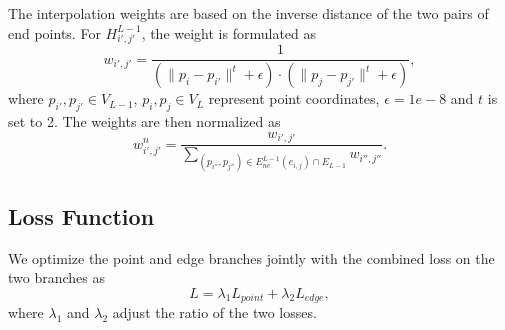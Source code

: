 \documentclass[10pt,twocolumn,letterpaper]{article}
\begin{document}
The interpolation weights are based on the inverse distance of the two pairs of end points. For $H_{i', j'}^{L-1}$, the weight is formulated as
\begin{equation}
w_{i', j'} = \frac{1}{(\| p_i - p_{i'} \|^t + \epsilon)\cdot(\| p_j - p_{j'} \|^t + \epsilon)},
\end{equation}
where $p_{i'}, p_{j'} \in V_{L-1}$, $p_i, p_j \in V_{L}$ represent point coordinates, $\epsilon = 1e-8$ and $t$ is set to 2. The weights are then normalized as
\begin{equation}
\label{eq_normal}
w_{i', j'}^n = \frac{w_{i', j'}}{\sum_{(p_{i''}, p_{j''}) \in E_{ne}^{L-1}(e_{i, j}) \cap E_{L-1}}w_{i'', j''}} .
\end{equation}

\subsection{Loss Function}
\label{sec_loss}
We optimize the point and edge branches jointly with the combined loss on the two branches as
\begin{equation}
L  = \lambda_1 L_{point} + \lambda_2 L_{edge},
\end{equation}
where $\lambda_1$ and $\lambda_2$ adjust the ratio of the two losses.
\end{document}
